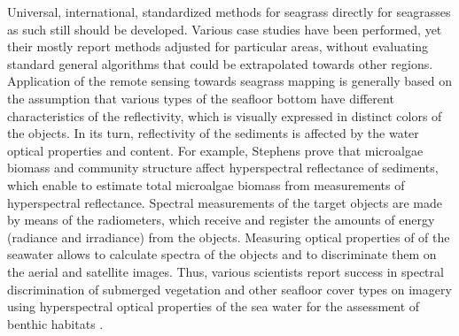 \documentclass[11pt]{article}
\begin{document}
Universal, international, standardized methods for seagrass directly for seagrasses
as such still should be developed. Various case studies have been performed, yet their mostly report
methods adjusted for particular areas, without evaluating standard general algorithms that could be
extrapolated towards other regions. \\ Application of the remote sensing towards seagrass mapping is
generally based on the assumption that various types of the seafloor bottom have different
characteristics of the reflectivity, which is visually expressed in distinct colors of the objects. In its
turn, reflectivity of the sediments is affected by the water optical properties and content. For
example, Stephens \cite{Stephens03}\label{Stephens03} prove that microalgae biomass and community structure affect
hyperspectral reflectance of sediments, which enable to estimate total microalgae biomass from
measurements of hyperspectral reflectance. 
Spectral measurements of the target objects are made
by means of the radiometers, which receive and register the amounts of energy (radiance and
irradiance) from the objects. Measuring optical properties of of the seawater allows to calculate spectra of the
objects and to discriminate them on the aerial and satellite images. Thus, various scientists report
success in spectral discrimination of submerged vegetation and other seafloor cover types on imagery
using hyperspectral optical properties of the sea water for the assessment of benthic habitats \cite{Lewis01,Louchard03,Dehouck08,Werdell03}\label{Lewis01}\label{Louchard03}\label{Dehouck08}\label{Werdell03}.
\end{document}
